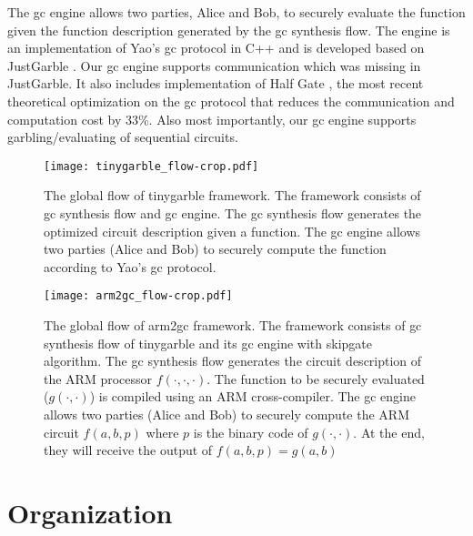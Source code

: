 The \acrshort{gc} engine allows two parties, Alice and Bob, to securely evaluate the function given the function description generated by the \acrshort{gc} synthesis flow.
The engine is an implementation of Yao's \acrshort{gc} protocol in C++ and is developed based on JustGarble \cite{bellare2013efficient}.
Our \acrshort{gc} engine supports communication which was missing in JustGarble.
It also includes implementation of Half Gate \cite{zahur2015two}, the most recent theoretical optimization on the \acrshort{gc} protocol that reduces the communication and computation cost by 33\%.
Also most importantly, our \acrshort{gc} engine supports garbling/evaluating of sequential circuits.

\begin{figure}[h]
\centering
\texttt{[image: tinygarble\_flow-crop.pdf]}
\caption{The global flow of \gls{tinygarble} framework.
The framework consists of \acrshort{gc} synthesis flow and \acrshort{gc} engine.
The \acrshort{gc} synthesis flow generates the optimized circuit description given a function.
The \acrshort{gc} engine allows two parties (Alice and Bob) to securely compute the function according to Yao's \acrshort{gc} protocol.
}
\label{fig:globalflow}
\end{figure}

\begin{figure}[h]
\centering
\texttt{[image: arm2gc\_flow-crop.pdf]}
\caption{The global flow of \gls{arm2gc} framework.
The framework consists of \acrshort{gc} synthesis flow of \gls{tinygarble} and its \acrshort{gc} engine with \gls{skipgate} algorithm.
The \acrshort{gc} synthesis flow generates the circuit description of the ARM processor $f(\cdot,\cdot,\cdot)$.
The function to be securely evaluated ($g(\cdot,\cdot)$) is compiled using an ARM cross-compiler.
The \acrshort{gc} engine allows two parties (Alice and Bob) to securely compute the ARM circuit $f(a,b,p)$ where $p$ is the binary code of $g(\cdot,\cdot)$.
At the end, they will receive the output of $f(a,b,p) = g(a,b)$
}
\label{fig:arm2gc-globalflow}
\end{figure}


\section{Organization}
